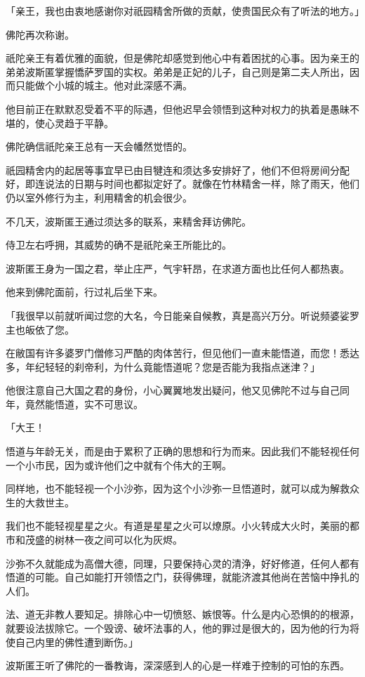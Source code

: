 \documentclass[twoside,openany]{book}
\begin{document}
「亲王，我也由衷地感谢你对祇园精舍所做的贡献，使贵国民众有了听法的地方。」

佛陀再次称谢。

祇陀亲王有着优雅的面貌，但是佛陀却感觉到他心中有着困扰的心事。因为亲王的弟弟波斯匿掌握憍萨罗国的实权。弟弟是正妃的儿子，自己则是第二夫人所出，因而只能做个小城的城主。他对此深感不满。

他目前正在默默忍受着不平的际遇，但他迟早会领悟到这种对权力的执着是愚昧不堪的，使心灵趋于平静。

佛陀确信祇陀亲王总有一天会幡然觉悟的。

祇园精舍内的起居等事宜早已由目犍连和须达多安排好了，他们不但将房间分配好，即连说法的日期与时间也都拟定好了。就像在竹林精舍一样，除了雨天，他们仍以室外修行为主，利用精舍的机会很少。

不几天，波斯匿王通过须达多的联系，来精舍拜访佛陀。

侍卫左右呼拥，其威势的确不是祇陀亲王所能比的。

波斯匿王身为一国之君，举止庄严，气宇轩昂，在求道方面也比任何人都热衷。

他来到佛陀面前，行过礼后坐下来。

「我很早以前就听闻过您的大名，今日能亲自候教，真是高兴万分。听说频婆娑罗主也皈依了您。

在敝国有许多婆罗门僧修习严酷的肉体苦行，但见他们一直未能悟道，而您！悉达多，年纪轻轻的刹帝利，为什么竟能悟道呢？您是否能为我指点迷津？」

他很注意自己大国之君的身份，小心翼翼地发出疑问，他又见佛陀不过与自己同年，竟然能悟道，实不可思议。

「大王！

悟道与年龄无关，而是由于累积了正确的思想和行为而来。因此我们不能轻视任何一个小市民，因为或许他们之中就有个伟大的王啊。

同样地，也不能轻视一个小沙弥，因为这个小沙弥一旦悟道时，就可以成为解救众生的大救世主。

我们也不能轻视星星之火。有道是星星之火可以燎原。小火转成大火时，美丽的都市和茂盛的树林一夜之间可以化为灰烬。

沙弥不久就能成为高僧大德，同理，只要保持心灵的清浄，好好修道，任何人都有悟道的可能。自己如能打开领悟之门，获得佛理，就能济渡其他尚在苦恼中挣扎的人们。

法、道无非教人要知足。排除心中一切愤怒、嫉恨等。什么是内心恐惧的的根源，就要设法拔除它。一个毁谤、破坏法事的人，他的罪过是很大的，因为他的行为将使自己内里的佛性遭到断伤。」

波斯匿王听了佛陀的一番教诲，深深感到人的心是一样难于控制的可怕的东西。
\end{document}
